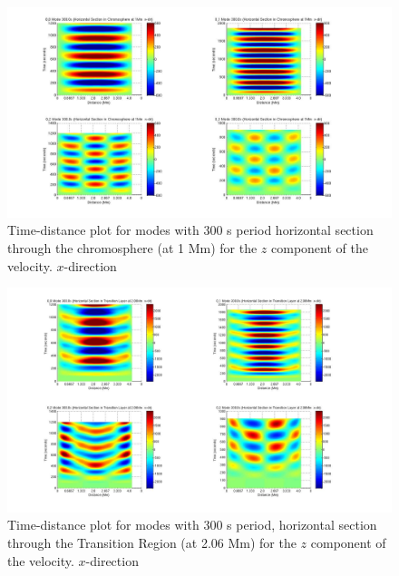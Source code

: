 \documentclass[preprint,authoryear,12pt]{elsarticle}
\begin{document}



\begin{figure}[h]
\includegraphics[scale=0.3]{imagesn/dt_300_0_0_hor_x_1Mm.jpg}
\caption{Time-distance plot for modes with 300 s period horizontal section through the chromosphere (at 1 Mm) for the $z$  component of the velocity. $x$-direction}
\label{Fig11}
\end{figure}

\begin{figure}[h]
\includegraphics[scale=0.3]{imagesn/dt_300_hor_x_2p06Mm.jpg}
\caption{Time-distance plot for modes with 300 s period, horizontal section through the Transition Region (at 2.06 Mm) 
for the $z$  component of the velocity. $x$-direction}
\end{figure}
\end{document}
